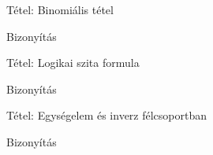 \documentclass{beamer}
\begin{document}
\begin{frame}

\begin{block}{Tétel: Binomiális tétel}
\end{block}

\begin{block}{Bizonyítás}
\end{block}

\end{frame}

\begin{frame}

\begin{block}{Tétel: Logikai szita formula}
\end{block}

\begin{block}{Bizonyítás}
\end{block}

\end{frame}








\begin{frame}

\begin{block}{Tétel: Egységelem és inverz félcsoportban}
\end{block}

\begin{block}{Bizonyítás}
\end{block}

\end{frame}
\end{document}
